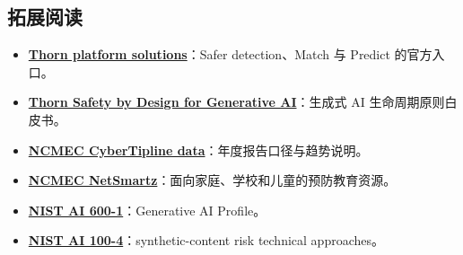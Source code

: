\documentclass[a4paper]{article}
\begin{document}
\subsection{拓展阅读}

{\small
\begin{itemize}[nosep,leftmargin=*]
  \item \href{https://www.thorn.org/solutions/for-platforms/}{\textbf{Thorn platform solutions}}：Safer detection、Match 与 Predict 的官方入口。
  \item \href{https://info.thorn.org/hubfs/thorn-safety-by-design-for-generative-AI.pdf}{\textbf{Thorn Safety by Design for Generative AI}}：生成式 AI 生命周期原则白皮书。
  \item \href{https://www.missingkids.org/gethelpnow/cybertipline/cybertiplinedata}{\textbf{NCMEC CyberTipline data}}：年度报告口径与趋势说明。
  \item \href{https://www.missingkids.org/netsmartz/home}{\textbf{NCMEC NetSmartz}}：面向家庭、学校和儿童的预防教育资源。
  \item \href{https://nvlpubs.nist.gov/nistpubs/ai/NIST.AI.600-1.pdf}{\textbf{NIST AI 600-1}}：Generative AI Profile。
  \item \href{https://nvlpubs.nist.gov/nistpubs/ai/NIST.AI.100-4.pdf}{\textbf{NIST AI 100-4}}：synthetic-content risk technical approaches。
\end{itemize}
}
\end{document}
